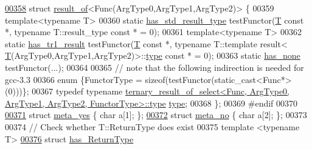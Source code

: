 \begin{DoxyCode}
\hyperlink{struct_eigen_1_1internal_1_1result__of_3_01_func_07_arg_type0_00_01_arg_type1_00_01_arg_type2_08_4}{00358} \textcolor{keyword}{struct }\hyperlink{struct_eigen_1_1internal_1_1result__of}{result\_of}<Func(ArgType0,ArgType1,ArgType2)> \{
00359     \textcolor{keyword}{template}<\textcolor{keyword}{typename} T>
00360     \textcolor{keyword}{static} \hyperlink{struct_eigen_1_1internal_1_1has__std__result__type}{has\_std\_result\_type}    testFunctor(\hyperlink{group___sparse_core___module}{T} \textcolor{keyword}{const} *, \textcolor{keyword}{typename} T::result\_type \textcolor{keyword}{const} 
      * = 0);
00361     \textcolor{keyword}{template}<\textcolor{keyword}{typename} T>
00362     \textcolor{keyword}{static} \hyperlink{struct_eigen_1_1internal_1_1has__tr1__result}{has\_tr1\_result}         testFunctor(\hyperlink{group___sparse_core___module}{T} \textcolor{keyword}{const} *, \textcolor{keyword}{typename} T::template result<
      \hyperlink{group___sparse_core___module}{T}(ArgType0,ArgType1,ArgType2)>::\hyperlink{group___sparse_core___module}{type} \textcolor{keyword}{const} * = 0);
00363     \textcolor{keyword}{static} \hyperlink{struct_eigen_1_1internal_1_1has__none}{has\_none}               testFunctor(...);
00364 
00365     \textcolor{comment}{// note that the following indirection is needed for gcc-3.3}
00366     \textcolor{keyword}{enum} \{FunctorType = \textcolor{keyword}{sizeof}(testFunctor(static\_cast<Func*>(0)))\};
00367     \textcolor{keyword}{typedef} \textcolor{keyword}{typename} 
      \hyperlink{group___sparse_core___module}{ternary\_result\_of\_select<Func, ArgType0, ArgType1, ArgType2, FunctorType>::type}
       \hyperlink{group___sparse_core___module}{type};
00368 \};
00369 \textcolor{preprocessor}{#endif}
00370 
\hyperlink{struct_eigen_1_1internal_1_1meta__yes}{00371} \textcolor{keyword}{struct }\hyperlink{struct_eigen_1_1internal_1_1meta__yes}{meta\_yes} \{ \textcolor{keywordtype}{char} a[1]; \};
\hyperlink{struct_eigen_1_1internal_1_1meta__no}{00372} \textcolor{keyword}{struct }\hyperlink{struct_eigen_1_1internal_1_1meta__no}{meta\_no}  \{ \textcolor{keywordtype}{char} a[2]; \};
00373 
00374 \textcolor{comment}{// Check whether T::ReturnType does exist}
00375 \textcolor{keyword}{template} <\textcolor{keyword}{typename} T>
\hyperlink{struct_eigen_1_1internal_1_1has___return_type}{00376} \textcolor{keyword}{struct }\hyperlink{struct_eigen_1_1internal_1_1has___return_type}{has\_ReturnType}

\end{DoxyCode}
